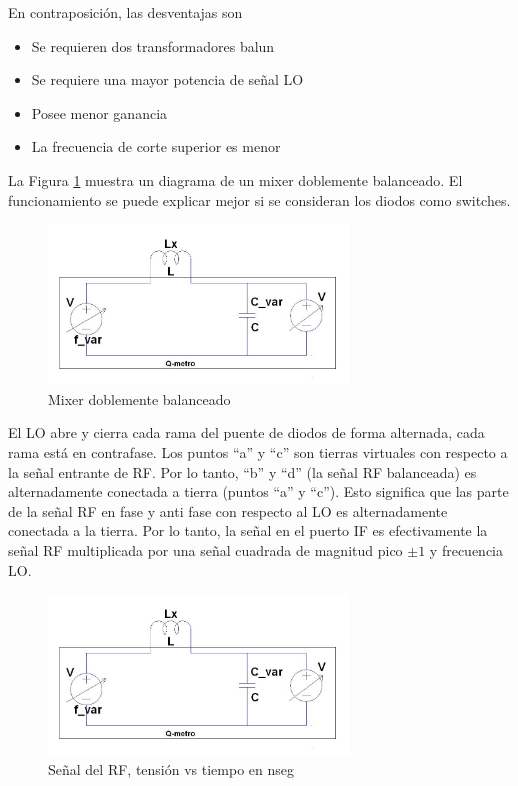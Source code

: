 \documentclass[a4paper,10pt]{article}
\begin{document}
	\indent En contraposición, las desventajas son

	\begin{itemize}
		\item Se requieren dos transformadores balun
		\item Se requiere una mayor potencia de señal LO
		\item Posee menor ganancia
		\item La frecuencia de corte superior es menor
	\end{itemize}

	\indent La Figura \ref{img:004} muestra un diagrama de un mixer doblemente 
	balanceado. El funcionamiento se puede explicar mejor si se consideran los 
	diodos como switches. \\
	
	\begin{figure}[!htb]
		\centering
		\includegraphics[width=8cm]{Images/qmetro.png}
		\caption{Mixer doblemente balanceado}
		\label{img:004}
	\end{figure}

	
	\indent El LO abre y cierra cada rama del puente de diodos de
	forma alternada, cada rama está en contrafase. Los puntos ``a'' y ``c'' son 
	tierras virtuales con respecto a la señal entrante de RF. Por lo tanto, ``b'' 
	y ``d'' (la señal RF balanceada) es alternadamente conectada a tierra (puntos 
	``a'' y ``c''). Esto significa que las parte de la señal RF en fase y anti fase 
	con respecto al LO es alternadamente conectada a la tierra. Por lo tanto, la
	señal en el puerto IF es efectivamente la señal RF multiplicada por una 
	señal cuadrada de magnitud pico $\pm 1$ y frecuencia LO. \\
	
	\begin{figure}[!htb]
		\centering
		\includegraphics[width=8cm]{Images/qmetro.png}
		\caption{Señal del RF, tensión vs tiempo en nseg}
		\label{img:005}
	\end{figure}
\end{document}
